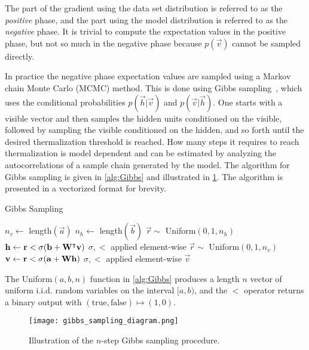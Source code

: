 The part of the gradient using the data set distribution is referred to as the \textit{positive} phase, and the part using the model distribution is referred to as the \textit{negative} phase.
It is trivial to compute the expectation values in the positive phase, but not so much in the negative phase because \( p(\vec{v}) \) cannot be sampled directly.

In practice the negative phase expectation values are sampled using a Markov chain Monte Carlo (MCMC) method.
This is done using Gibbs sampling~\cite{hinton_rbm_training}, which uses the conditional probabilities \( p(\vec{h}|\vec{v}) \) and \( p(\vec{v}|\vec{h}) \).
One starts with a visible vector and then samples the hidden units conditioned on the visible, followed by sampling the visible conditioned on the hidden, and so forth until the desired thermalization threshold is reached.
How many steps it requires to reach thermalization is model dependent and can be estimated by analyzing the autocorrelations of a sample chain generated by the model.
The algorithm for Gibbs sampling is given in \cref{alg:Gibbs} and illustrated in \cref{fig:gibbs_sampling_diagram}.
The algorithm is presented in a vectorized format for brevity.

\begin{algorithm}
\caption{Gibbs Sampling}
\begin{algorithmic}[1]
        \State $n_v \gets$ length$(\vec{a})$
        \State $n_h \gets$ length$(\vec{b})$
            \State $\vec{r} \sim$ Uniform$(0, 1, n_h)$
            \State $\mathbf{h} \gets \mathbf{r} < \sigma(\mathbf{b} + \mathbf{W}^\intercal\mathbf{v})$
                \Comment $\sigma, <$ applied element-wise
            \State $\vec{r} \sim$ Uniform$(0, 1, n_v)$
            \State $\mathbf{v} \gets \mathbf{r} < \sigma(\mathbf{a} + \mathbf{W}\mathbf{h})$
                \Comment $\sigma, <$ applied element-wise
        \EndFor
        \State \Return $\vec{v}$
    \EndProcedure
\end{algorithmic}
\label{alg:Gibbs}
\end{algorithm}
The Uniform$(a, b, n)$ function in \cref{alg:Gibbs} produces a length \( n \) vector of uniform i.i.d. random variables on the interval $[a, b)$, and the \( < \) operator returns a binary output with \( (\text{true}, \text{false}) \mapsto (1, 0) \).

\begin{figure}
    \begin{center}
        \texttt{[image: gibbs\_sampling\_diagram.png]}
    \end{center}
    \caption{Illustration of the \( n \)-step Gibbs sampling procedure.}
    \label{fig:gibbs_sampling_diagram}
\end{figure}

